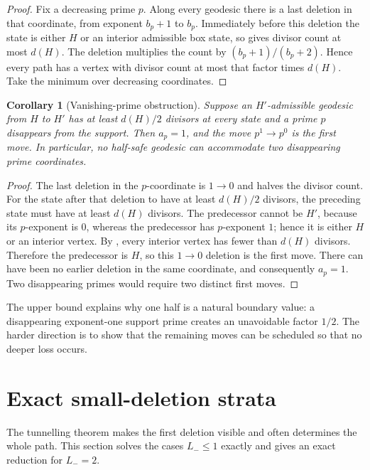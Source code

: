 \documentclass[11pt]{article}
\numberwithin{equation}{section}
\theoremstyle{blueplain}
\newtheorem{corollary}[theorem]{Corollary}
\theoremstyle{bluedef}
\begin{document}
\begin{proof}
Fix a decreasing prime $p$.  Along every geodesic there is a last deletion in that coordinate, from exponent $b_p+1$ to $b_p$.  Immediately before this deletion the state is either $H$ or an interior admissible box state, so  gives divisor count at most $d(H)$.  The deletion multiplies the count by $(b_p+1)/(b_p+2)$.  Hence every path has a vertex with divisor count at most that factor times $d(H)$.  Take the minimum over decreasing coordinates.
\end{proof}

\begin{corollary}[Vanishing-prime obstruction]
\label{cor:vanishing-prime-obstruction}
Suppose an $H'$-admissible geodesic from $H$ to $H'$ has at least $d(H)/2$ divisors at every state and a prime $p$ disappears from the support.  Then $a_p=1$, and the move $p^1\to p^0$ is the first move.  In particular, no half-safe geodesic can accommodate two disappearing prime coordinates.
\end{corollary}

\begin{proof}
The last deletion in the $p$-coordinate is $1\to0$ and halves the divisor count.  For the state after that deletion to have at least $d(H)/2$ divisors, the preceding state must have at least $d(H)$ divisors.  The predecessor cannot be $H'$, because its $p$-exponent is $0$, whereas the predecessor has $p$-exponent $1$; hence it is either $H$ or an interior vertex.  By , every interior vertex has fewer than $d(H)$ divisors.  Therefore the predecessor is $H$, so this $1\to0$ deletion is the first move.  There can have been no earlier deletion in the same coordinate, and consequently $a_p=1$.  Two disappearing primes would require two distinct first moves.
\end{proof}

The upper bound explains why one half is a natural boundary value: a disappearing exponent-one support prime creates an unavoidable factor $1/2$.  The harder direction is to show that the remaining moves can be scheduled so that no deeper loss occurs.

\section{Exact small-deletion strata}
\label{sec:small-deletion}

The tunnelling theorem makes the first deletion visible and often determines the whole path.  This section solves the cases $L_-\le1$ exactly and gives an exact reduction for $L_-=2$.
\end{document}
